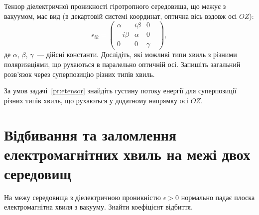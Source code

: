 \begin{problem}\label{pr:etensor}


Тензор діелектричної проникності гіротропного середовища, що межує з вакуумом, має вид (в декартовій
системі координат, оптична вісь вздовж осі $OZ$):
\begin{equation}\label{eq:etensor}
	\epsilon_{ik}  = \left( {\begin{array}{*{20}{c}}
			\alpha       & {i\beta } & 0      & \\
			{ - i\beta } & \alpha    & 0      & \\
			0            & 0         & \gamma &
		\end{array}} \right),
\end{equation}
де $\alpha$, $\beta$, $\gamma$~--- дійсні константи.  Дослідіть, які можливі типи хвиль з різними
поляризаціями, що рухаються в паралельно оптичній осі. Запишіть загальний розв’язок через суперпозицію
різних типів хвиль.

\end{problem}

\begin{problem}
За умов задачі~\ref{pr:etensor} знайдіть густину потоку енергії для суперпозиції різних типів хвиль,
що рухаються у додатному напрямку осі $OZ$.
\end{problem}

\section{Відбивання та заломлення електромагнітних хвиль на межі двох середовищ}

\begin{problem}
На межу середовища з діелектричною проникністю $\epsilon > 0 $  нормально падає плоска електромагнітна хвиля з вакууму. Знайти коефіцієнт відбиття.
\end{problem}

